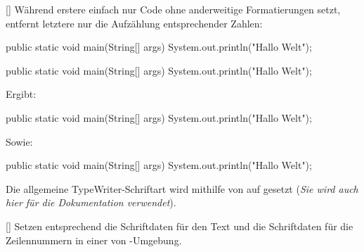 [\cmdlist {}]
Während erstere einfach nur Code ohne anderweitige Formatierungen setzt, entfernt letztere nur die Aufzählung entsprechender Zahlen:
\begin{latex}
\begin{lstplain}[language=lJava]
public static void main(String[] args) {
    System.out.println("Hallo Welt");
}
\end{lstplain}
\begin{lstnonum}[language=lJava]
public static void main(String[] args) {
    System.out.println("Hallo Welt");
}
\end{lstnonum}
\end{latex}
Ergibt:
\begin{lstplain}[language=lJava]
public static void main(String[] args) {
    System.out.println("Hallo Welt");
}
\end{lstplain}
Sowie:
\begin{lstnonum}[language=lJava]
public static void main(String[] args) {
    System.out.println("Hallo Welt");
}
\end{lstnonum}

Die allgemeine TypeWriter-Schriftart wird mithilfe von  auf  gesetzt (\textit{Sie wird auch hier für die Dokumentation verwendet}).

%
%
%

[\cmdlist{}]
Setzen entsprechend die Schriftdaten für den Text und die Schriftdaten für die Zeilennummern in einer von -Umgebung.

